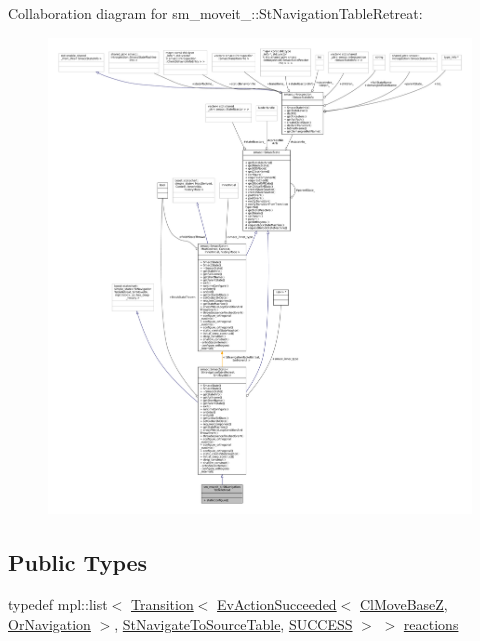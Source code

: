 Collaboration diagram for sm\+\_\+moveit\+\_\+:\+:St\+Navigation\+Table\+Retreat\+:
\nopagebreak
\begin{figure}[H]
\begin{center}
\leavevmode
\includegraphics[width=350pt]{structsm__moveit__4_1_1StNavigationTableRetreat__coll__graph}
\end{center}
\end{figure}
\subsection*{Public Types}
\begin{DoxyCompactItemize}
\item 
typedef mpl\+::list$<$ \hyperlink{classsmacc_1_1Transition}{Transition}$<$ \hyperlink{structsmacc_1_1default__events_1_1EvActionSucceeded}{Ev\+Action\+Succeeded}$<$ \hyperlink{classcl__move__base__z_1_1ClMoveBaseZ}{Cl\+Move\+BaseZ}, \hyperlink{classsm__moveit__4_1_1OrNavigation}{Or\+Navigation} $>$, \hyperlink{structsm__moveit__4_1_1StNavigateToSourceTable}{St\+Navigate\+To\+Source\+Table}, \hyperlink{structsmacc_1_1default__transition__tags_1_1SUCCESS}{S\+U\+C\+C\+E\+SS} $>$ $>$ \hyperlink{structsm__moveit__4_1_1StNavigationTableRetreat_abc8d03746076d2cf10d7c9b8cd31537c}{reactions}
\end{DoxyCompactItemize}
